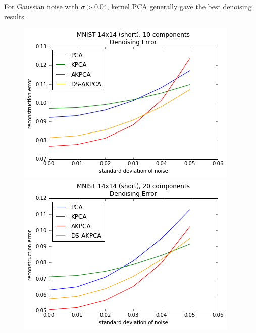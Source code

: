 \documentclass[]{article}
\begin{document}
For Gaussian noise with $\sigma > 0.04$, kernel PCA generally gave the best denoising results.
\begin{figure}[h]
\begin{center}
\includegraphics[scale=0.5]{figures/mnist_14_short_denoise_k10}
\includegraphics[scale=0.5]{figures/mnist_14_short_denoise_k20}


\end{center}
\end{figure}
\end{document}
